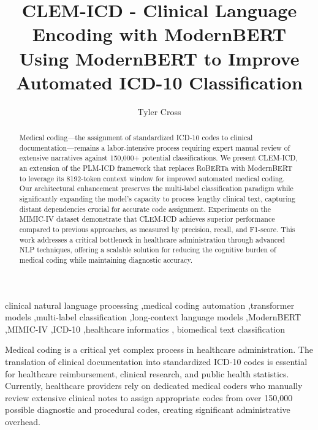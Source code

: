 \documentclass[
  authoryear,
  preprint]{elsarticle}
\begin{document}
\begin{frontmatter}
\title{CLEM-ICD - Clinical Language Encoding with
ModernBERT \\\large{Using ModernBERT to Improve Automated ICD-10
Classification} }
\author[1]{Tyler Cross%
%
}


        
\begin{abstract}
Medical coding---the assignment of standardized ICD-10 codes to clinical
documentation---remains a labor-intensive process requiring expert
manual review of extensive narratives against 150,000+ potential
classifications. We present CLEM-ICD, an extension of the PLM-ICD
framework that replaces RoBERTa with ModernBERT to leverage its
8192-token context window for improved automated medical coding. Our
architectural enhancement preserves the multi-label classification
paradigm while significantly expanding the model's capacity to process
lengthy clinical text, capturing distant dependencies crucial for
accurate code assignment. Experiments on the MIMIC-IV dataset
demonstrate that CLEM-ICD achieves superior performance compared to
previous approaches, as measured by precision, recall, and F1-score.
This work addresses a critical bottleneck in healthcare administration
through advanced NLP techniques, offering a scalable solution for
reducing the cognitive burden of medical coding while maintaining
diagnostic accuracy.
\end{abstract}





\begin{keyword}
    clinical natural language processing \sep medical coding
automation \sep transformer models \sep multi-label
classification \sep long-context language
models \sep ModernBERT \sep MIMIC-IV \sep ICD-10 \sep healthcare
informatics \sep 
    biomedical text classification
\end{keyword}
\end{frontmatter}
    

Medical coding is a critical yet complex process in healthcare
administration. The translation of clinical documentation into
standardized ICD-10 codes is essential for healthcare reimbursement,
clinical research, and public health statistics. Currently, healthcare
providers rely on dedicated medical coders who manually review extensive
clinical notes to assign appropriate codes from over 150,000 possible
diagnostic and procedural codes, creating significant administrative
overhead.
\end{document}
